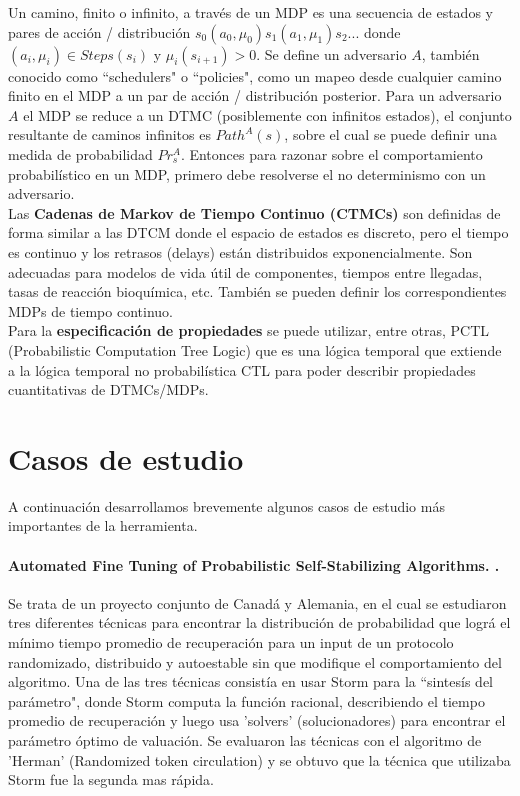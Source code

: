 \documentclass[11pt]{article}
\begin{document}
Un camino, finito o infinito, a trav\'es de un MDP es una secuencia de estados y pares de acci\'on / distribuci\'on $s_0(a_0, \mu_0)s_1 (a_1, \mu_1)s_2...$ donde $(a_i, \mu_i) \in Steps(s_i)$ y $\mu_i(s_{i+1})>0$. %
Se define un adversario $A$, tambi\'en conocido como ``schedulers" o ``policies", como un mapeo desde cualquier camino finito en el MDP a un par de acci\'on / distribuci\'on posterior. Para un adversario $A$ el MDP se reduce a un DTMC (posiblemente con infinitos estados), el conjunto resultante de caminos infinitos es $Path^A(s)$, sobre el cual se puede definir una medida de probabilidad $Pr^A_s$. Entonces para razonar sobre el comportamiento probabil\'istico en un MDP, primero debe resolverse el no determinismo con un adversario. \\

Las \textbf{Cadenas de Markov de Tiempo Continuo (CTMCs)} son definidas de forma similar a las DTCM donde el espacio de estados es discreto, pero el tiempo es continuo y los retrasos (delays) est\'an distribuidos exponencialmente. Son adecuadas para modelos de vida \'util de componentes, tiempos entre llegadas, tasas de reacci\'on bioqu\'imica, etc. Tambi\'en se pueden definir los correspondientes MDPs de tiempo continuo. \\


Para la \textbf{especificaci\'on de propiedades} se puede utilizar, entre otras, PCTL (Probabilistic Computation Tree Logic) que es una l\'ogica temporal que extiende a la l\'ogica temporal no probabil\'istica CTL para poder describir propiedades cuantitativas de DTMCs/MDPs.

\section{Casos de estudio}

A continuaci\'on desarrollamos brevemente algunos casos de estudio m\'as importantes de la herramienta.
\paragraph{Automated Fine Tuning of Probabilistic Self-Stabilizing Algorithms. \cite{Saba}.}


Se trata de un proyecto conjunto de Canad\'a y Alemania, en el cual se estudiaron tres diferentes t\'ecnicas para encontrar la distribuci\'on de probabilidad que logr\'a el m\'inimo tiempo promedio de recuperaci\'on para un input de un protocolo randomizado, distribuido y autoestable sin que modifique el comportamiento del algoritmo. Una de las tres t\'ecnicas consist\'ia en usar Storm para la ``sintes\'is del par\'ametro", donde Storm computa la funci\'on racional, describiendo el tiempo promedio de recuperaci\'on y luego usa 'solvers' (solucionadores) para encontrar el par\'ametro \'optimo de valuaci\'on. Se evaluaron las t\'ecnicas con el algoritmo de 'Herman' (Randomized token circulation) y se obtuvo que la t\'ecnica que utilizaba Storm fue la segunda mas r\'apida.
\end{document}

